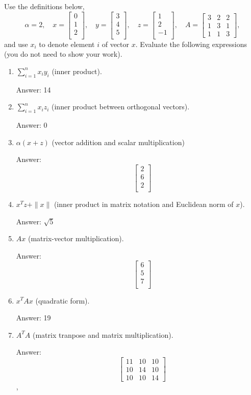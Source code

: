 \documentclass{article}
\def\ans#1{\par\gre{Answer: #1}}
\def\blu#1{{\color{blu}#1}}
\def\gre#1{{\color{gre}#1}}
\def\norm#1{\|#1\|}
\def\enum#1{\begin{enumerate}#1\end{enumerate}}
\begin{document}
Use the definitions below,
\[
\alpha = 2,\quad
x = \left[\begin{array}{c}
0\\
1\\
2\\
\end{array}\right], \quad
y = \left[\begin{array}{c}
3\\
4\\
5\\
\end{array}\right],\quad
z = \left[\begin{array}{c}
1\\
2\\
-1\\
\end{array}\right],\quad
A = \left[\begin{array}{ccc}
3 & 2 & 2\\
1 & 3 & 1\\
1 & 1 & 3
\end{array}\right],
\]
and use $x_i$ to denote element $i$ of vector $x$.
\blu{Evaluate the following expressions} (you do not need to show your work).
\enum{
\item $\sum_{i=1}^n x_iy_i$ (inner product).
\ans{14}
\item $\sum_{i=1}^n x_iz_i$ (inner product between orthogonal vectors).
\ans{0}
\item $\alpha(x+z)$ (vector addition and scalar multiplication)
\ans{\[\quad
	 \left[\begin{array}{c}
		2\\
		6\\
		2\\
	\end{array}\right]\]}
\item $x^Tz + \norm{x}$ (inner product in matrix notation and Euclidean norm of $x$).
\ans{$\sqrt{5}$}
\item $Ax$ (matrix-vector multiplication).
\ans{\[\quad
	 \left[\begin{array}{c}
	6\\
	5\\
	7\\
	\end{array}\right]\]}
\item $x^TAx$ (quadratic form).
\ans{19}
\item $A^TA$ (matrix tranpose and matrix multiplication).
\ans{\[\quad
  \left[\begin{array}{ccc}
	11 & 10 & 10\\
	10 & 14 & 10\\
	10 & 10 & 14
\end{array}\right]\]},
}
\end{document}
